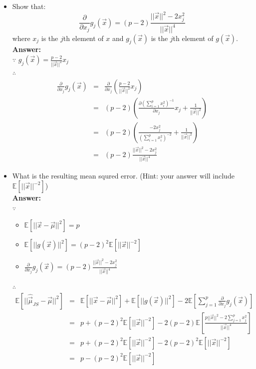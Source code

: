 \documentclass{article}
\begin{document}
\begin{enumerate}
\begin{itemize}
		\item Show that:
		$$\frac{\partial}{\partial x_j}g_j(\vec{x}) = (p-2)\frac{||\vec{x}||^2-2x_j^2}{||\vec{x}||^4}$$
		where $x_j$ is the $j$th element of $x$ and $g_j(\vec{x})$ is the $j$th element of $g(\vec{x})$.
		\\\textbf{Answer:}\\
		$\because$ $g_j(\vec{x})=\frac{p-2}{||\vec{x}||^2}x_j$ \\
		$\therefore$ 
		\begin{equation}
		\nonumber
		\begin{array}{rcl}
		\frac{\partial}{\partial x_j}g_j(\vec{x}) & = & \frac{\partial}{\partial x_j}(\frac{p-2}{||\vec{x}||^2}x_j) \\
		& = & (p-2) (\frac{\partial (\sum_{i=1}^{p}{x^2_i})^{-1}}{\partial x_j}x_j+\frac{1}{||\vec{x}||^2}) \\
		& = & (p-2) (\frac{-2x_j^2}{(\sum_{i=1}^{p}{x^2_i})^{-2}}+\frac{1}{||\vec{x}||^2}) \\
		& = & (p-2)\frac{||\vec{x}||^2-2x_j^2}{||\vec{x}||^4}
		\end{array}
		\end{equation}
		
		\item What is the resulting mean squred error. (Hint: your answer will include $\mathbb{E}[||\vec{x}||^{-2}]$)
		\\\textbf{Answer:}\\
		$\because$
		\begin{itemize}
			\item $\mathbb{E}[||\vec{x}-\vec{\mu}||^2] = p$
			\item $\mathbb{E}[||g(\vec{x})||^2] = (p-2)^2\mathbb{E}[||\vec{x}||^{-2}]$
			\item $\frac{\partial}{\partial x_j}g_j(\vec{x}) = (p-2)\frac{||\vec{x}||^2-2x_j^2}{||\vec{x}||^4}$
		\end{itemize}
		$\therefore$\\
		\begin{equation}
		\nonumber
		\begin{array}{rcl}
		\mathbb{E}[||\hat{\vec{\mu}}_{JS}-\vec{\mu}||^2] & = & \mathbb{E}[||\vec{x}-\vec{\mu}||^2]+\mathbb{E}[||g(\vec{x})||^2]-2\mathbb{E}\left[\sum_{j=1}^{p}{\frac{\partial}{\partial x_j}g_j(\vec{x})}\right] \\
		& = & p + (p-2)^2\mathbb{E}[||\vec{x}||^{-2}] - 2(p-2)\mathbb{E}[\frac{p||\vec{x}||^2-2\sum_{j=1}^{p}{x_j^2}}{||\vec{x}||^4}] \\
		& = & p + (p-2)^2\mathbb{E}[||\vec{x}||^{-2}] - 2(p-2)^2\mathbb{E}[||\vec{x}||^{-2}] \\
		& = & p - (p-2)^2\mathbb{E}[||\vec{x}||^{-2}] \\
		\end{array}
		\end{equation}
		

\end{itemize}
\end{enumerate}
\end{document}
